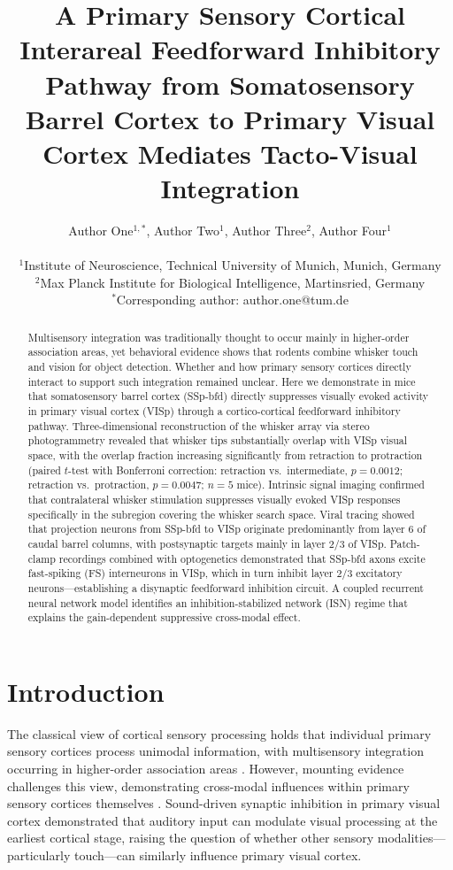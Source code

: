 \documentclass[11pt]{article}
\title{A Primary Sensory Cortical Interareal Feedforward Inhibitory Pathway from Somatosensory Barrel Cortex to Primary Visual Cortex Mediates Tacto-Visual Integration}
\author{
Author One$^{1,*}$, Author Two$^{1}$, Author Three$^{2}$, Author Four$^{1}$ \\
\\
$^{1}$Institute of Neuroscience, Technical University of Munich, Munich, Germany \\
$^{2}$Max Planck Institute for Biological Intelligence, Martinsried, Germany \\
$^{*}$Corresponding author: author.one@tum.de
}
\date{}
\begin{document}
\maketitle

\begin{abstract}
Multisensory integration was traditionally thought to occur mainly in higher-order association areas, yet behavioral evidence shows that rodents combine whisker touch and vision for object detection. Whether and how primary sensory cortices directly interact to support such integration remained unclear. Here we demonstrate in mice that somatosensory barrel cortex (SSp-bfd) directly suppresses visually evoked activity in primary visual cortex (VISp) through a cortico-cortical feedforward inhibitory pathway. Three-dimensional reconstruction of the whisker array via stereo photogrammetry revealed that whisker tips substantially overlap with VISp visual space, with the overlap fraction increasing significantly from retraction to protraction (paired $t$-test with Bonferroni correction: retraction vs.\ intermediate, $p = 0.0012$; retraction vs.\ protraction, $p = 0.0047$; $n = 5$ mice). Intrinsic signal imaging confirmed that contralateral whisker stimulation suppresses visually evoked VISp responses specifically in the subregion covering the whisker search space. Viral tracing showed that projection neurons from SSp-bfd to VISp originate predominantly from layer 6 of caudal barrel columns, with postsynaptic targets mainly in layer 2/3 of VISp. Patch-clamp recordings combined with optogenetics demonstrated that SSp-bfd axons excite fast-spiking (FS) interneurons in VISp, which in turn inhibit layer 2/3 excitatory neurons---establishing a disynaptic feedforward inhibition circuit. A coupled recurrent neural network model identifies an inhibition-stabilized network (ISN) regime that explains the gain-dependent suppressive cross-modal effect.
\end{abstract}

\section{Introduction}

The classical view of cortical sensory processing holds that individual primary sensory cortices process unimodal information, with multisensory integration occurring in higher-order association areas \citep{stein2012}. However, mounting evidence challenges this view, demonstrating cross-modal influences within primary sensory cortices themselves \citep{ghazanfar2006}. Sound-driven synaptic inhibition in primary visual cortex \citep{iurilli2012} demonstrated that auditory input can modulate visual processing at the earliest cortical stage, raising the question of whether other sensory modalities---particularly touch---can similarly influence primary visual cortex.
\end{document}
